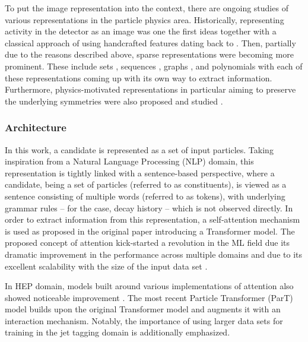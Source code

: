 To put the image representation into the context, there are ongoing studies of various representations in the particle physics area. Historically, representing activity in the detector as an image was one the first ideas together with a classical approach of using handcrafted features dating back to \cite{DENBY1988429}. Then, partially due to the reasons described above, sparse representations were becoming more prominent. These include sets \cite{Komiske:2018cqr}, sequences \cite{deLima:2021fwm}, graphs \cite{Thais:2022iok}, and polynomials \cite{Munoz:2022gjq} with each of these representations coming up with its own way to extract information. Furthermore, physics-motivated representations in particular aiming to preserve the underlying symmetries were also proposed and studied \cite{Dreyer:2020brq, Baldi:2022okj, Bogatskiy:2022hub, Shimmin:2021pkm}.

\subsubsection{Architecture}
In this work, a \tauh candidate is represented as a set of input particles. Taking inspiration from a Natural Language Processing (NLP) domain, this representation is tightly linked with a sentence-based perspective, where a \tauh candidate, being a set of particles (referred to as constituents), is viewed as a sentence consisting of multiple words (referred to as tokens), with underlying grammar rules -- for the \tauh case, decay history -- which is not observed directly. In order to extract information from this representation, a self-attention mechanism is used as proposed in the original paper \cite{vaswani2017attention} introducing a Transformer model. The proposed concept of attention kick-started a revolution in the ML field due its dramatic improvement in the performance across multiple domains and due to its excellent scalability with the size of the input data set \cite{phuong2022formal}. 

In HEP domain, models built around various implementations of attention also showed noticeable improvement \cite{Mikuni:2020wpr, Mikuni:2021pou}. The most recent Particle Transformer (ParT) \cite{Qu:2022mxj} model builds upon the original Transformer model and augments it with an interaction mechanism. Notably, the importance of using larger data sets for training in the jet tagging domain is additionally emphasized.

